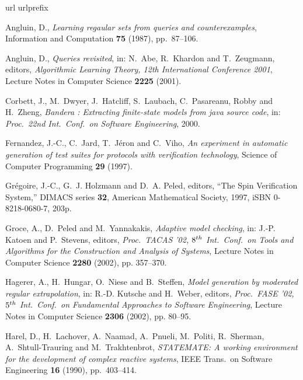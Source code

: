 \def\Nst#1{$#1^{st}$}\def\Nnd#1{$#1^{nd}$}\def\Nrd#1{$#1^{rd}$}\def\Nth#1{$#1^%
{th}$}
\begin{thebibliography}{10}
\expandafter\ifx\csname url\endcsname\relax
  \def\url#1{\texttt{#1}}\fi
\expandafter\ifx\csname urlprefix\endcsname\relax\def\urlprefix{URL }\fi
\newcommand{\enquote}[1]{``#1''}

Angluin, D., \emph{Learning regaular sets from queries and counterexamples},
  Information and Computation \textbf{75} (1987), pp.~87--106.

Angluin, D., \emph{Queries revisited}, in: N.~Abe, R.~Khardon and T.~Zeugmann,
  editors, \emph{Algorithmic Learning Theory, 12th International Conference
  2001},  Lecture Notes in Computer Science  \textbf{2225} (2001).

Corbett, J., M.~Dwyer, J.~Hatcliff, S.~Laubach, C.~Pasareanu, Robby and
  H.~Zheng, \emph{Bandera : Extracting finite-state models from java source
  code}, in: \emph{Proc.\ 22nd Int.\ Conf.\ on Software Engineering}, 2000.

Fernandez, J.-C., C.~Jard, T.~J{\'e}ron and C.~Viho, \emph{An experiment in
  automatic generation of test suites for protocols with verification
  technology}, Science of Computer Programming \textbf{29} (1997).

Gr\'egoire, J.-C., G.~J. Holzmann and D.~A. Peled, editors, \enquote{The Spin
  Verification System,}  DIMACS series  \textbf{32}, American Mathematical
  Society, 1997, iSBN 0-8218-0680-7, 203p.

Groce, A., D.~Peled and M.~Yannakakis, \emph{Adaptive model checking}, in:
  J.-P. Katoen and P.~Stevens, editors, \emph{Proc.\ {TACAS '02}, \Nth{8} Int.\
  Conf.\ on Tools and Algorithms for the Construction and Analysis of Systems},
   Lecture Notes in Computer Science  \textbf{2280} (2002), pp. 357--370.

Hagerer, A., H.~Hungar, O.~Niese and B.~Steffen, \emph{Model generation by
  moderated regular extrapolation}, in: R.-D. Kutsche and H.~Weber, editors,
  \emph{Proc.\ {FASE '02}, \Nth{5} Int.\ Conf.\ on Fundamental Approaches to
  Software Engineering},  Lecture Notes in Computer Science  \textbf{2306}
  (2002), pp. 80--95.

Harel, D., H.~Lachover, A.~Naamad, A.~Pnueli, M.~Politi, R.~Sherman,
  A.~Shtull-Trauring and M.~Trakhtenbrot, \emph{{STATEMATE}: A working
  environment for the development of complex reactive systems}, IEEE Trans.\ on
  Software Engineering \textbf{16} (1990), pp.~403--414.


\end{thebibliography}
